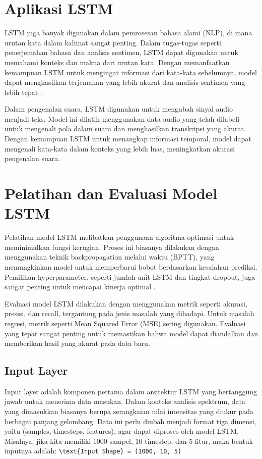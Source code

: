 \section{Aplikasi LSTM}
\par LSTM juga banyak digunakan dalam pemrosesan bahasa alami (NLP), di mana urutan kata dalam kalimat sangat penting. Dalam tugas-tugas seperti penerjemahan bahasa dan analisis sentimen, LSTM dapat digunakan untuk memahami konteks dan makna dari urutan kata. Dengan memanfaatkan kemampuan LSTM untuk mengingat informasi dari kata-kata sebelumnya, model dapat menghasilkan terjemahan yang lebih akurat dan analisis sentimen yang lebih tepat \citep{zhang2019}.

\par Dalam pengenalan suara, LSTM digunakan untuk mengubah sinyal audio menjadi teks. Model ini dilatih menggunakan data audio yang telah dilabeli untuk mengenali pola dalam suara dan menghasilkan transkripsi yang akurat. Dengan kemampuan LSTM untuk menangkap informasi temporal, model dapat mengenali kata-kata dalam konteks yang lebih luas, meningkatkan akurasi pengenalan suara.

\section{Pelatihan dan Evaluasi Model LSTM}
\par Pelatihan model LSTM melibatkan penggunaan algoritma optimasi untuk meminimalkan fungsi kerugian. Proses ini biasanya dilakukan dengan menggunakan teknik backpropagation melalui waktu (BPTT), yang memungkinkan model untuk memperbarui bobot berdasarkan kesalahan prediksi. Pemilihan hyperparameter, seperti jumlah unit LSTM dan tingkat dropout, juga sangat penting untuk mencapai kinerja optimal \citep{bengio2012}.

\par Evaluasi model LSTM dilakukan dengan menggunakan metrik seperti akurasi, presisi, dan recall, tergantung pada jenis masalah yang dihadapi. Untuk masalah regresi, metrik seperti Mean Squared Error (MSE) sering digunakan. Evaluasi yang tepat sangat penting untuk memastikan bahwa model dapat diandalkan dan memberikan hasil yang akurat pada data baru.



\subsection{Input Layer}
\par Input layer adalah komponen pertama dalam arsitektur LSTM yang bertanggung jawab untuk menerima data masukan. Dalam konteks analisis spektrum, data yang dimasukkan biasanya berupa serangkaian nilai intensitas yang diukur pada berbagai panjang gelombang. Data ini perlu diubah menjadi format tiga dimensi, yaitu (samples, timesteps, features), agar dapat diproses oleh model LSTM. Misalnya, jika kita memiliki 1000 sampel, 10 timestep, dan 5 fitur, maka bentuk inputnya adalah:
\lstinline[]|\text{Input Shape} = (1000, 10, 5)|

